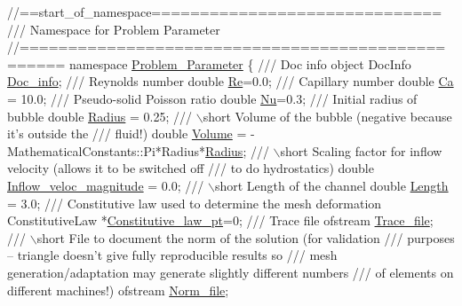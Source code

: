  
\begin{DoxyCodeInclude}
\textcolor{comment}{//==start\_of\_namespace==============================}
\textcolor{comment}{/// Namespace for Problem Parameter}
\textcolor{comment}{}\textcolor{comment}{//==================================================}
 \textcolor{keyword}{namespace }\hyperlink{namespaceProblem__Parameter}{Problem\_Parameter}
 \{    \textcolor{comment}{}
\textcolor{comment}{  /// Doc info object}
\textcolor{comment}{}  DocInfo \hyperlink{namespaceProblem__Parameter_a1dd3c6bcf97360c8fe0d288ca7610351}{Doc\_info};
  \textcolor{comment}{}
\textcolor{comment}{  /// Reynolds number}
\textcolor{comment}{}  \textcolor{keywordtype}{double} \hyperlink{namespaceProblem__Parameter_acc656299287d4d9a8374c2c501750b4f}{Re}=0.0;
\textcolor{comment}{}
\textcolor{comment}{  /// Capillary number}
\textcolor{comment}{}  \textcolor{keywordtype}{double} \hyperlink{namespaceProblem__Parameter_af6194d2571881779c678fbabc1503d47}{Ca} = 10.0;
\textcolor{comment}{}
\textcolor{comment}{  /// Pseudo-solid Poisson ratio}
\textcolor{comment}{}  \textcolor{keywordtype}{double} \hyperlink{namespaceProblem__Parameter_abec2e733c8f2d3c18ebc702b3f80cc17}{Nu}=0.3;
\textcolor{comment}{}
\textcolor{comment}{  /// Initial radius of bubble}
\textcolor{comment}{}  \textcolor{keywordtype}{double} \hyperlink{namespaceProblem__Parameter_a903237528f0e9bb92debcc8842576cca}{Radius} = 0.25;
\textcolor{comment}{}
\textcolor{comment}{  /// \(\backslash\)short Volume of the bubble (negative because it's outside the}
\textcolor{comment}{  /// fluid!)}
\textcolor{comment}{}  \textcolor{keywordtype}{double} \hyperlink{namespaceProblem__Parameter_aad8e0a2d1ec39a8dd7357a43bcc5f20e}{Volume} = -MathematicalConstants::Pi*Radius*\hyperlink{namespaceProblem__Parameter_a903237528f0e9bb92debcc8842576cca}{Radius};
\textcolor{comment}{}
\textcolor{comment}{  /// \(\backslash\)short Scaling factor for inflow velocity (allows it to be switched off}
\textcolor{comment}{  /// to do hydrostatics)}
\textcolor{comment}{}  \textcolor{keywordtype}{double} \hyperlink{namespaceProblem__Parameter_a7792613e563a733ad88b8e15d126fc3a}{Inflow\_veloc\_magnitude} = 0.0;
\textcolor{comment}{}
\textcolor{comment}{  /// \(\backslash\)short Length of the channel}
\textcolor{comment}{}  \textcolor{keywordtype}{double} \hyperlink{namespaceProblem__Parameter_a7b67840fea463f29b53d12f7bd7cb34b}{Length} = 3.0;
\textcolor{comment}{}
\textcolor{comment}{  /// Constitutive law used to determine the mesh deformation}
\textcolor{comment}{}  ConstitutiveLaw *\hyperlink{namespaceProblem__Parameter_a810f05c8d3e3331aed75643557d1057c}{Constitutive\_law\_pt}=0;
\textcolor{comment}{}
\textcolor{comment}{  /// Trace file}
\textcolor{comment}{}  ofstream \hyperlink{namespaceProblem__Parameter_a55310be5f2dfcb5fcfe35d71f9c16e06}{Trace\_file};
\textcolor{comment}{}
\textcolor{comment}{  /// \(\backslash\)short File to document the norm of the solution (for validation }
\textcolor{comment}{  /// purposes -- triangle doesn't give fully reproducible results so}
\textcolor{comment}{  /// mesh generation/adaptation may generate slightly different numbers}
\textcolor{comment}{  /// of elements on different machines!)}
\textcolor{comment}{}  ofstream \hyperlink{namespaceProblem__Parameter_a388e06a5e637b21378ab1832e5564bec}{Norm\_file};
  

\end{DoxyCodeInclude}
